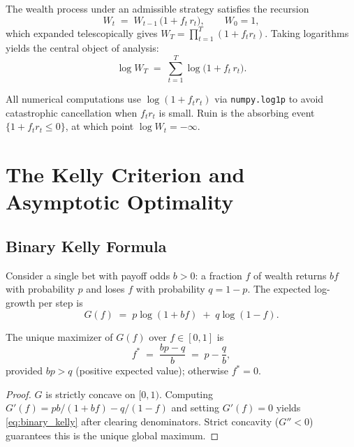 The wealth process under an admissible strategy satisfies the recursion
\begin{equation}
    W_{t} \;=\; W_{t-1}\,\bigl(1 + f_t\,r_t\bigr), \qquad W_0 = 1,
    \label{eq:wealth_recursion}
\end{equation}
which expanded telescopically gives $W_T = \prod_{t=1}^{T}(1 + f_t r_t)$.
Taking logarithms yields the central object of analysis:
\begin{equation}
    \log W_T \;=\; \sum_{t=1}^{T} \log\!\bigl(1 + f_t\,r_t\bigr).
    \label{eq:log_wealth}
\end{equation}

\begin{remark}
All numerical computations use $\log(1 + f_t r_t)$ via \texttt{numpy.log1p}
to avoid catastrophic cancellation when $f_t r_t$ is small.  Ruin is the
absorbing event $\{1 + f_t r_t \leq 0\}$, at which point $\log W_t = -\infty$.
\end{remark}

\section{The Kelly Criterion and Asymptotic Optimality}

\subsection{Binary Kelly Formula}

Consider a single bet with payoff odds $b > 0$: a fraction $f$ of wealth
returns $bf$ with probability $p$ and loses $f$ with probability $q = 1-p$.
The expected log-growth per step is
\[
    G(f) \;=\; p\log(1+bf) \;+\; q\log(1-f).
\]

\begin{proposition}
\label{prop:binary_kelly}
The unique maximizer of $G(f)$ over $f \in [0,1]$ is
\begin{equation}
    f^* \;=\; \frac{bp - q}{b} \;=\; p - \frac{q}{b},
    \label{eq:binary_kelly}
\end{equation}
provided $bp > q$ (positive expected value); otherwise $f^* = 0$.
\end{proposition}

\begin{proof}
$G$ is strictly concave on $[0,1)$.  Computing $G'(f) = pb/(1+bf) - q/(1-f)$
and setting $G'(f) = 0$ yields \eqref{eq:binary_kelly} after clearing
denominators.  Strict concavity ($G'' < 0$) guarantees this is the unique
global maximum.
\end{proof}

